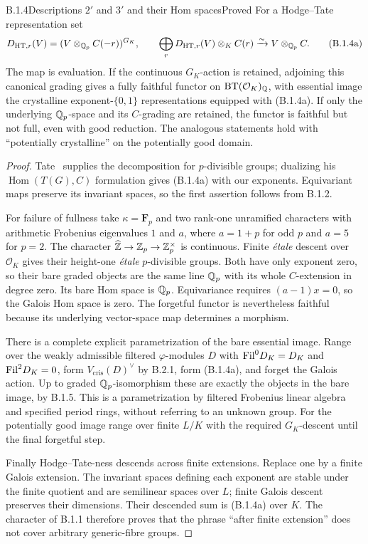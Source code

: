 \begin{result}{B.1.4}{Descriptions $2'$ and $3'$ and their Hom spaces}{Proved}
For a Hodge--Tate representation set
\[
 D_{\mathrm{HT},r}(V)=(V\otimes_{\mathbb Q_p}C(-r))^{G_K},\qquad
 \bigoplus_rD_{\mathrm{HT},r}(V)\otimes_K C(r)
       \xrightarrow{\sim}V\otimes_{\mathbb Q_p}C.
 \tag{B.1.4a}
\]
The map is evaluation. If the continuous $G_K$-action is retained,
adjoining this canonical grading gives a fully faithful functor
on $\operatorname{BT}(\mathcal O_K)_\mathbb Q$, with essential image
the crystalline exponent-$\{0,1\}$ representations equipped with
(B.1.4a). If only the underlying $\mathbb Q_p$-space and its $C$-grading
are retained, the functor is faithful but not full, even with good
reduction. The analogous statements hold with ``potentially
crystalline'' on the potentially good domain.
\end{result}
\begin{proof}
Tate~\cite[\S4.1, Theorem 3 and Corollary 2]{Tate1967} supplies
the decomposition for $p$-divisible groups; dualizing his
$\operatorname{Hom}(T(G),C)$ formulation gives (B.1.4a) with our
exponents. Equivariant maps preserve its invariant spaces, so
the first assertion follows from B.1.2.

For failure of fullness take $\kappa=\mathbf F_p$ and two rank-one
unramified characters with arithmetic Frobenius eigenvalues $1$
and $a$, where $a=1+p$ for odd $p$ and $a=5$ for $p=2$.
The character $\widehat{\mathbb Z}\to\mathbb Z_p\to\mathbb Z_p^\times$ is continuous.
Finite \emph{\'etale} descent over $\mathcal O_K$ gives their
height-one \emph{\'etale} $p$-divisible groups. Both have only
exponent zero, so their bare graded objects are the same line
$\mathbb Q_p$ with its whole $C$-extension in degree zero. Its bare Hom
space is $\mathbb Q_p$. Equivariance requires $(a-1)x=0$, so the Galois
Hom space is zero. The forgetful functor is nevertheless faithful
because its underlying vector-space map determines a morphism.

There is a complete explicit parametrization of the bare essential
image. Range over the weakly admissible filtered $\varphi$-modules
$D$ with $\mathrm{Fil}^0D_K=D_K$ and $\mathrm{Fil}^2D_K=0$, form
$V_{\mathrm{cris}}(D)^\vee$ by B.2.1, form (B.1.4a), and forget
the Galois action. Up to graded $\mathbb Q_p$-isomorphism these are
exactly the objects in the bare image, by B.1.5. This is a
parametrization by filtered Frobenius linear algebra and specified
period rings, without referring to an unknown group. For the
potentially good image range over finite $L/K$ with the required
$G_K$-descent until the final forgetful step.

Finally Hodge--Tate-ness descends across finite extensions. Replace
one by a finite Galois extension. The invariant spaces defining
each exponent are stable under the finite quotient and are
semilinear spaces over $L$; finite Galois descent preserves their
dimensions. Their descended sum is (B.1.4a) over $K$.
The character of B.1.1 therefore proves that the phrase ``after
finite extension'' does not cover arbitrary generic-fibre groups.
\end{proof}

